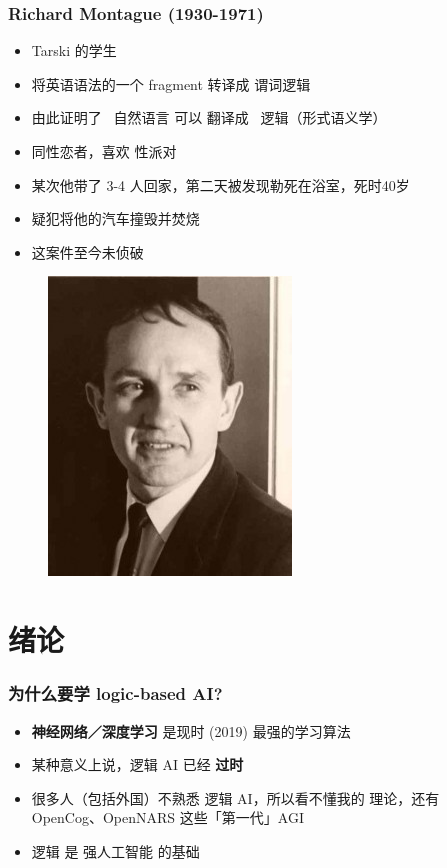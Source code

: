 \documentclass[15pt]{beamer}
\begin{document}
\begin{frame}
\frametitle{Richard Montague (1930-1971)}
\begin{minipage}[t]{0.62\linewidth}
	\begin{itemize}
		\item Tarski 的学生
		\item 将英语语法的一个 fragment 转译成 谓词逻辑
		\item 由此证明了 {\color{red}\ 自然语言} 可以 翻译成 {\color{red}\ 逻辑}（形式语义学）
		\item 同性恋者，喜欢 性派对
		\item 某次他带了 3-4 人回家，第二天被发现勒死在浴室，死时40岁
		\item 疑犯将他的汽车撞毁并焚烧
		\item 这案件至今未侦破
	\end{itemize}
\end{minipage}
\hfill
\begin{minipage}[t]{0.35\linewidth}
	\begin{figure}[H]
		\includegraphics[scale=0.5]{Montague.jpg}
	\end{figure}
\end{minipage}
\end{frame}

\section[Section]{绪论}
\frame{\sectionpage}

\begin{frame}
\frametitle{为什么要学 logic-based AI?}
\begin{itemize}
	\item \textbf{神经网络／深度学习} 是现时 (2019) 最强的学习算法
	\item 某种意义上说，逻辑 AI 已经 \textbf{过时}
	\item 很多人（包括外国）不熟悉 逻辑 AI，所以看不懂我的 理论，还有 OpenCog、OpenNARS 这些「第一代」AGI
	\item 逻辑 是 强人工智能 的基础
\end{itemize}
\end{frame}
\end{document}
